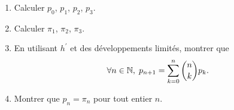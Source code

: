 \begin{enumerate}
\item  Calculer $p_{0}$, $p_{1}$, $p_{2}$, $p_{3}$.

\item  Calculer $\pi _{1}$, $\pi _{2}$, $\pi _{3}$.

\item  En utilisant $h^{\prime }$ et des d{\'e}veloppements limit{\'e}s, montrer que 
\[
\forall n \in \mathbb{N}, \; p_{n+1}=\sum_{k=0}^{n}\binom{n}{k}p_{k}.
\]

\item  Montrer que $p_{n}=\pi _{n}$ pour tout entier $n.$
\end{enumerate}
